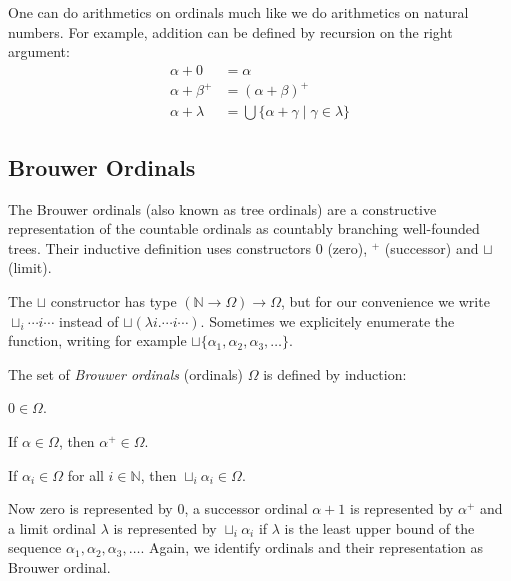 
One can do arithmetics on ordinals much like we do arithmetics on natural
numbers. For example, addition can be defined by recursion on the right
argument:
\begin{align*}
  \alpha + 0       &= \alpha\\
  \alpha + \beta^+ &= (\alpha + \beta)^+\\
  \alpha + \lambda &= \bigcup \{ \alpha + \gamma \; | \; \gamma \in \lambda \}
\end{align*}


\subsection{Brouwer Ordinals}\label{sub:brouwer}

The Brouwer ordinals (also known as tree ordinals) are a constructive
representation of the countable ordinals as countably branching well-founded
trees. Their inductive definition uses constructors $0$ (zero), $^+$
(successor) and $\sqcup$ (limit).

The $\sqcup$ constructor has type $(\mathbb{N} \rightarrow \Omega) \rightarrow
\Omega$, but for our convenience we write $\sqcup_i \cdots i \cdots$ instead
of $\sqcup (\lambda i . \cdots i \cdots)$. Sometimes we explicitely enumerate
the function, writing for example $\sqcup \{ \alpha_1, \alpha_2, \alpha_3,
\ldots \}$.

\begin{definition}[Ordinals]\label{def:ordinals}
The set of \emph{Brouwer ordinals} (ordinals) $\Omega$ is defined by
induction:
\begin{compactenum}
  \item
    $0 \in \Omega$.
  \item
    If $\alpha \in \Omega$, then $\alpha^+ \in \Omega$.
  \item
    If $\alpha_i \in \Omega$ for all $i \in \mathbb{N}$, then $\sqcup_i
    \alpha_i \in \Omega$.
\end{compactenum}
\end{definition}

Now zero is represented by $0$, a successor ordinal $\alpha +1$ is represented
by $\alpha^+$ and a limit ordinal $\lambda$ is represented by $\sqcup_i
\alpha_i$ if $\lambda$ is the least upper bound of the sequence $\alpha_1,
\alpha_2, \alpha_3, \ldots$. %
Again, we identify ordinals and their representation as Brouwer ordinal.

